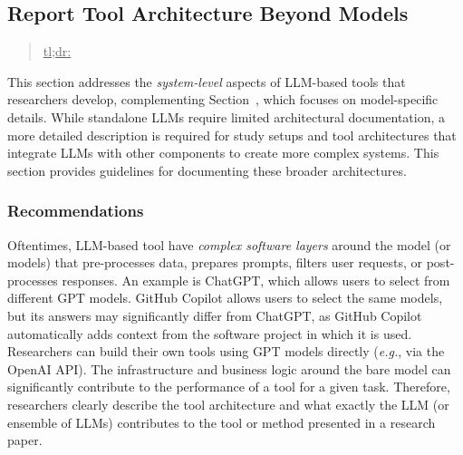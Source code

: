 



\subsection{Report Tool Architecture Beyond Models}
\label{sec:report-tool-architecture-beyond-models}

\begin{quote}
\underline{tl;dr:} 
\end{quote}

This section addresses the \emph{system-level} aspects of LLM-based tools that researchers develop, complementing Section~\modelversion, which focuses on model-specific details.
While standalone LLMs require limited architectural documentation, a more detailed description is required for study setups and tool architectures that integrate LLMs with other components to create more complex systems.
This section provides guidelines for documenting these broader architectures.

\subsubsection{Recommendations}

Oftentimes, LLM-based tool have \emph{complex software layers} around the model (or models) that pre-processes data, prepares prompts, filters user requests, or post-processes responses.
An example is ChatGPT, which allows users to select from different GPT models.
GitHub Copilot allows users to select the same models, but its answers may significantly differ from ChatGPT, as GitHub Copilot automatically adds context from the software project in which it is used.
Researchers can build their own tools using GPT models directly (\textit{e.g.}, via the OpenAI API).
The infrastructure and business logic around the bare model can significantly contribute to the performance of a tool for a given task.
Therefore, researchers \must clearly describe the tool architecture and what exactly the LLM (or ensemble of LLMs) contributes to the tool or method presented in a research paper.

